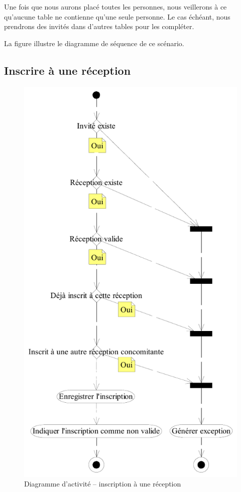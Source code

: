 Une fois que nous aurons placé toutes les personnes, nous veillerons à ce qu'aucune table ne contienne qu'une seule personne. Le cas échéant, nous prendrons des invités dans d'autres tables pour les compléter.

La figure  illustre le diagramme de séquence de ce scénario.

\subsection{Inscrire à une réception}

\begin{figure}
  \centering
  \includegraphics[scale=.88]{IMG/da_inscription_reception}
  \caption{Diagramme d'activité -- inscription à une réception}
  \label{img_da_inscription_reception}
\end{figure}

